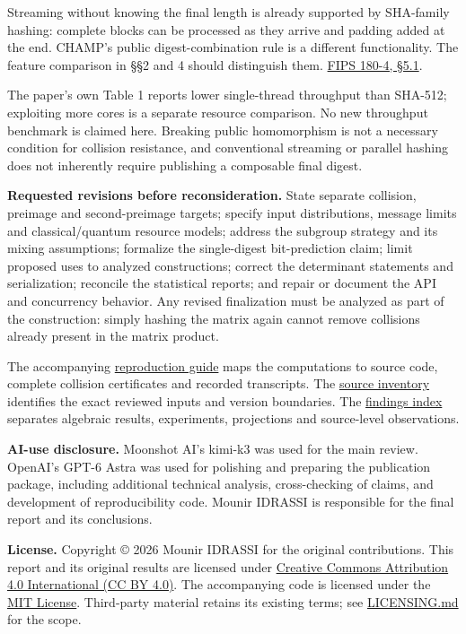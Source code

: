 \documentclass[
  english,
  11pt,
  a4paper,
]{article}
\begin{document}
Streaming without knowing the final length is already supported by
SHA-family hashing: complete blocks can be processed as they arrive and
padding added at the end. CHAMP's public digest-combination rule is a
different functionality. The feature comparison in §§2 and 4 should
distinguish them.
\href{https://nvlpubs.nist.gov/nistpubs/FIPS/NIST.FIPS.180-4.pdf}{FIPS
180-4, §5.1}.

The paper's own Table 1 reports lower single-thread throughput than
SHA-512; exploiting more cores is a separate resource comparison. No new
throughput benchmark is claimed here. Breaking public homomorphism is
not a necessary condition for collision resistance, and conventional
streaming or parallel hashing does not inherently require publishing a
composable final digest.

\textbf{Requested revisions before reconsideration.} State separate
collision, preimage and second-preimage targets; specify input
distributions, message limits and classical/quantum resource models;
address the subgroup strategy and its mixing assumptions; formalize the
single-digest bit-prediction claim; limit proposed uses to analyzed
constructions; correct the determinant statements and serialization;
reconcile the statistical reports; and repair or document the API and
concurrency behavior. Any revised finalization must be analyzed as part
of the construction: simply hashing the matrix again cannot remove
collisions already present in the matrix product.

The accompanying \href{REPRODUCING.md}{reproduction guide} maps the
computations to source code, complete collision certificates and
recorded transcripts. The \href{PROVENANCE.md}{source inventory}
identifies the exact reviewed inputs and version boundaries. The
\href{FINDINGS.md}{findings index} separates algebraic results,
experiments, projections and source-level observations.


\textbf{AI-use disclosure.} Moonshot AI's kimi-k3 was used for the main
review. OpenAI's GPT-6 Astra was used for polishing and preparing the
publication package, including additional technical analysis,
cross-checking of claims, and development of reproducibility code.
Mounir IDRASSI is responsible for the final report and its conclusions.

\textbf{License.} Copyright © 2026 Mounir IDRASSI for the original
contributions. This report and its original results are licensed under
\href{https://creativecommons.org/licenses/by/4.0/}{Creative Commons
Attribution 4.0 International (CC BY 4.0)}. The accompanying code is
licensed under the \href{LICENSE}{MIT License}. Third-party material
retains its existing terms; see \url{LICENSING.md} for the scope.
\end{document}
